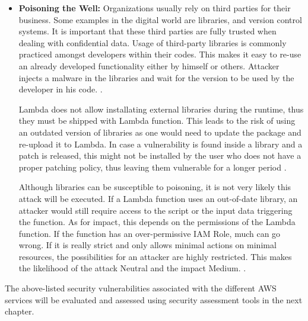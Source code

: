 \begin{itemize}
    \item \textbf{Poisoning the Well:} Organizations usually rely on third parties for their business.
    Some examples
    in the
    digital world are libraries, and version control systems.
    It is important that
    these third parties are fully trusted when dealing with confidential data.
    Usage of third-party libraries is
    commonly practiced amongst developers within their codes.
    This makes it easy to re-use an already developed
    functionality either by himself or others.
    Attacker injects a malware in the libraries and wait for the version to be used by the developer in his code.
    \cite{84}.

    Lambda does not allow installating external libraries during the runtime, thus they must be shipped with Lambda function.
    This leads to the risk of using an outdated version of libraries as one would need to update the package and re-upload it to Lambda.
    In case a vulnerability is found inside a library and a patch is released, this might not be installed by the
    user who does not have a proper patching policy, thus leaving them vulnerable for a longer period \cite{63}.

    Although libraries can be susceptible to poisoning, it is not very likely this attack will be executed. If a Lambda function uses an out-of-date library, an attacker would still require access to the script or the input data triggering the function. As for impact, this depends on the permissions of the Lambda function. If the function has an over-permissive IAM Role, much can go wrong. If it is really strict and only allows minimal actions on minimal resources, the possibilities for an attacker are highly restricted. This makes the likelihood of the attack Neutral and the impact Medium. \cite{64}.
\end{itemize}

\par The above-listed security vulnerabilities associated with the different AWS services will be evaluated and assessed using security assessment tools in the next chapter.









